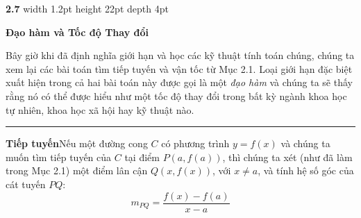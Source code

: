 \vspace{9mm}

\noindent
\begin{minipage}[b]{45mm}
  \hfill
  {\fontsize{24}{28}\selectfont\bfseries\color{stewartblue} 2.7}\hspace{2.5mm}%
  {\color{stewartline}\vrule width 1.2pt height 22pt depth 4pt}
\end{minipage}%
\hspace{4mm}%
\begin{minipage}[b]{124mm}
  {\fontsize{18}{22}\selectfont\bfseries\color{stewarttitle} Đạo hàm và Tốc độ Thay đổi}
\end{minipage}

\vspace{4.5mm}

\noindent
\hspace{49mm}%
\begin{minipage}[t]{125mm}
\normalsize\setlength{\parskip}{3.5mm}
Bây giờ khi đã định nghĩa giới hạn và học các kỹ thuật tính toán chúng, chúng ta xem lại các bài toán tìm tiếp tuyến và vận tốc từ Mục 2.1. Loại giới hạn đặc biệt xuất hiện trong cả hai bài toán này được gọi là một \emph{đạo hàm} và chúng ta sẽ thấy rằng nó có thể được hiểu như một tốc độ thay đổi trong bất kỳ ngành khoa học tự nhiên, khoa học xã hội hay kỹ thuật nào.

\noindent
{\color{stewartblue}\rule{2.2mm}{2.2mm}}\hspace{2mm}\textbf{Tiếp tuyến}\quad Nếu một đường cong $C$ có phương trình $y = f(x)$ và chúng ta muốn tìm tiếp tuyến của $C$ tại điểm $P(a, f(a))$, thì chúng ta xét (như đã làm trong Mục 2.1) một điểm lân cận $Q(x, f(x))$, với $x \neq a$, và tính hệ số góc của cát tuyến $PQ$:
\begin{equation*}
  m_{PQ} = \frac{f(x) - f(a)}{x - a}
\end{equation*}
\end{minipage}

\vfill
